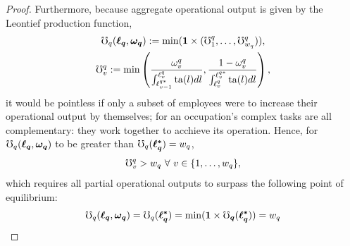\documentclass[hidelinks, nonatbib]{elsarticle}
\begin{document}
\begin{lemma}
\begin{proof}
        Furthermore, because aggregate operational output is given by the Leontief production function, 
        \begin{gather}
            \mho_{q}(
                \boldsymbol{\ell_q}
                ,\boldsymbol{\omega_q}
            )
            :=
            \min(
                \boldsymbol{1}
                \times
                (
                    \mho_{1}^{q}
                    ,
                    \dots
                    ,
                    \mho_{w_q}^{q}
                )
            )
            ,
            \\
            \mho_{v}^{q}
            := 
            \min
            \left(
                    \frac{
                        \omega_{v}^{q}
                    }{
                        \int_{\ell_{v-1}^{q*}}^{\ell_{v}^{q}}{
                            \text{ta}(l)dl
                        }
                    }
                    ,
                    \frac{
                        1 - \omega_{v}^{q}
                    }{
                        \int_{\ell_{v}^{q}}^{\ell_{v}^{q*}}{
                            \text{ta}(l)dl
                        }
                    }
                \right)
            ,
        \end{gather}
        it would be pointless if only a subset of employees were to increase their operational output by themselves; for an occupation's complex tasks are all complementary: they work together to acchieve its operation. Hence, for $\mho_{q}(
            \boldsymbol{\ell_q}
            ,\boldsymbol{\omega_q}
        )$ to be greater than $
        \mho_{q}(
            \boldsymbol{\ell_{q}^{*}}
        )
        =
        w_q$,
        \begin{gather}
            \mho_{v}^{q} > w_q
            \
            \forall
            \
            v \in \{1, \dots, w_q\}
            ,
        \end{gather}
        which requires all partial operational outputs to surpass the following point of equilibrium:
        \begin{align}
            &\oo_{q}(
                \boldsymbol{\ell_q}
                ,\boldsymbol{\omega_q}
            )
            =
            \oo_{q}(
                \boldsymbol{\ell_{q}^{*}}
            ) 
            =
            \min(
                \boldsymbol{1}
                \times
                \boldsymbol{\oo_q}(
                    \boldsymbol{\ell_{q}^{*}}
                )
            )
            =
            w_q
            \\

\end{align}
\end{proof}
\end{lemma}
\end{document}
